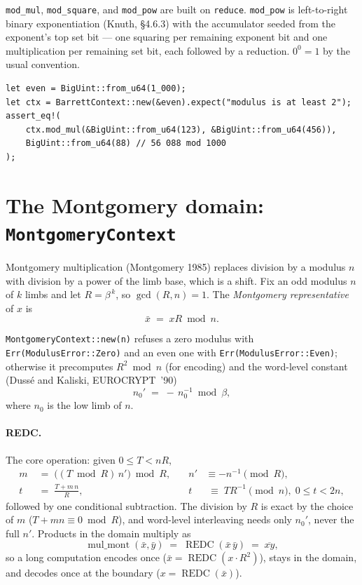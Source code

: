 \documentclass[11pt]{article}
\newcommand{\code}[1]{\texttt{#1}}
\newcommand{\REDC}{\operatorname{REDC}}
\begin{document}
\code{mod\_mul}, \code{mod\_square}, and \code{mod\_pow} are built on
\code{reduce}. \code{mod\_pow} is left-to-right binary exponentiation
(Knuth, \S4.6.3) with the accumulator seeded from the exponent's top set
bit --- one squaring per remaining exponent bit and one multiplication per
remaining set bit, each followed by a reduction. $0^0 = 1$ by the usual
convention.

\begin{lstlisting}
let even = BigUint::from_u64(1_000);
let ctx = BarrettContext::new(&even).expect("modulus is at least 2");
assert_eq!(
    ctx.mod_mul(&BigUint::from_u64(123), &BigUint::from_u64(456)),
    BigUint::from_u64(88) // 56 088 mod 1000
);
\end{lstlisting}

\section{The Montgomery domain: \code{MontgomeryContext}}
\label{sec:montgomery}

Montgomery multiplication (Montgomery 1985) replaces division by a modulus
$n$ with division by a power of the limb base, which is a shift. Fix an odd
modulus $n$ of $k$ limbs and let $R = \beta^{\,k}$, so $\gcd(R, n) = 1$.
The \emph{Montgomery representative} of $x$ is
\begin{equation}
\bar{x} \;=\; xR \bmod n .
\end{equation}

\code{MontgomeryContext::new(n)} refuses a zero modulus with
\code{Err(ModulusError::Zero)} and an even one with
\code{Err(ModulusError::Even)}; otherwise it precomputes $R^2 \bmod n$ (for encoding) and the word-level
constant (Duss\'e and Kaliski, EUROCRYPT~'90)
\begin{equation}
n_0' \;=\; -\,n_0^{-1} \bmod \beta ,
\end{equation}
where $n_0$ is the low limb of $n$.

\paragraph{REDC.} The core operation: given $0 \le T < nR$,
\begin{equation}
\begin{aligned}
m &\;=\; \bigl( (T \bmod R)\, n' \bigr) \bmod R,
&\quad n' &\equiv -n^{-1} \pmod{R},\\
t &\;=\; \frac{T + m\,n}{R},
&\quad t &\;\equiv\; T R^{-1} \pmod{n},\; 0 \le t < 2n,
\end{aligned}
\end{equation}
followed by one conditional subtraction. The division by $R$ is exact by
the choice of $m$ ($T + mn \equiv 0 \bmod R$), and word-level interleaving
needs only $n_0'$, never the full $n'$. Products in the domain multiply as
\begin{equation}
\operatorname{mul\_mont}(\bar x, \bar y) \;=\; \REDC(\bar x\, \bar y)
\;=\; \overline{x y},
\end{equation}
so a long computation encodes once ($\bar x = \REDC(x \cdot R^2)$), stays in
the domain, and decodes once at the boundary ($x = \REDC(\bar x)$).
\end{document}
